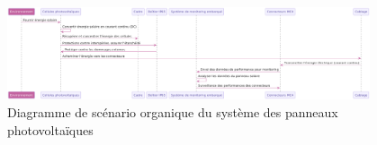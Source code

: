 \documentclass{article}
\begin{document}
\begin{figure}[H]
    \centering
    \includegraphics[width=0.95\textwidth]{diagramme_de_scenario_organique.png}
    \caption{Diagramme de scénario organique du système des panneaux photovoltaïques}
    \label{fig:diagramme_scenario_organique}

\end{figure}
\end{document}
